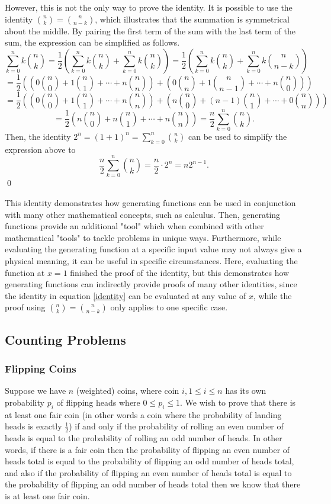 \documentclass[12pt]{article}
\begin{document}
However, this is not the only way to prove the identity. It is possible to use the identity $\binom{n}{k}=\binom{n}{n-k}$, which illustrates that the summation is symmetrical about the middle. By pairing the first term of the sum with the last term of the sum, the expression can be simplified as follows.
\[\sum_{k=0}^n k\binom{n}{k}=\frac{1}{2}\left(\sum_{k=0}^{n}k\binom{n}{k} + \sum_{k=0}^{n}k\binom{n}{k}\right) = \frac{1}{2} \left(\sum_{k=0}^{n}k\binom{n}{k} + \sum_{k=0}^n k\binom{n}{n-k}\right)\]
\[=\frac{1}{2}\left(\left(0\binom{n}{0}+1\binom{n}{1}+\cdots + n\binom{n}{n}\right) + \left(0\binom{n}{n}+1\binom{n}{n-1}+\cdots + n\binom{n}{0}\right)\right)\]
\[=\frac{1}{2}\left(\left(0\binom{n}{0}+1\binom{n}{1}+\cdots + n\binom{n}{n}\right) + \left(n\binom{n}{0}+(n-1)\binom{n}{1}+\cdots + 0\binom{n}{n}\right)\right)\]
\[=\frac{1}{2}\left(n\binom{n}{0}+n\binom{n}{1}+\cdots + n\binom{n}{n}\right) = \frac{n}{2}\sum_{k=0}^n \binom{n}{k}.\]
Then, the identity $2^n = (1+1)^n=\sum_{k=0}^n\binom{n}{k}$ can be used to simplify the expression above to
\[\frac{n}{2}\sum_{k=0}^n \binom{n}{k}=\frac{n}{2} \cdot 2^n = n2^{n-1}.\] \qed

This identity demonstrates how generating functions can be used in conjunction with many other mathematical concepts, such as calculus. Then, generating functions provide an additional "tool" which when combined with other mathematical "tools" to tackle problems in unique ways. Furthermore, while evaluating the generating function at a specific input value may not always give a physical meaning, it can be useful in specific circumstances. Here, evaluating the function at $x=1$ finished the proof of the identity, but this demonstrates how generating functions can indirectly provide proofs of many other identities, since the identity in equation \ref{identity} can be evaluated at any value of $x$, while the proof using $\binom{n}{k}=\binom{n}{n-k}$ only applies to one specific case.

\subsection{Counting Problems}
\subsubsection{Flipping Coins}
Suppose we have $n$ (weighted) coins, where coin $i, 1 \le i \le n$ has its own probability $p_i$ of flipping heads where $0 \le p_i \le 1$. We wish to prove that there is at least one fair coin (in other words a coin where the probability of landing heads is exactly $\frac{1}{2}$) if and only if the probability of rolling an even number of heads is equal to the probability of rolling an odd number of heads. In other words, if there is a fair coin then the probability of flipping an even number of heads total is equal to the probability of flipping an odd number of heads total, and also if the probability of flipping an even number of heads total is equal to the probability of flipping an odd number of heads total then we know that there is at least one fair coin.
\end{document}
